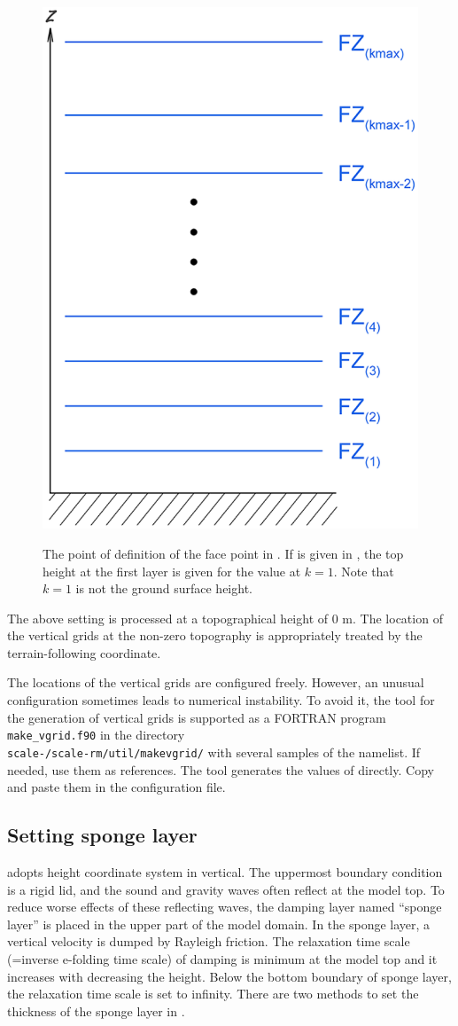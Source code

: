 \begin{figure}[tb]
\begin{center}
  \includegraphics[width=0.4\hsize]{./figure/verticalface.eps}\\
  \caption{The point of definition of the face point in \scalerm. If  is given in , the top height at the first layer is given for the value at $k=1$. Note that $k=1$ is not the ground surface height.}
  \label{fig:scale_grid}
\end{center}
\end{figure}

The above setting is processed at a topographical height of 0 m.
The location of the vertical grids at the non-zero topography is appropriately treated by the terrain-following coordinate.

The locations of the vertical grids are configured freely.
However, an unusual configuration sometimes leads to numerical instability. To avoid it, the tool for the generation of vertical grids is supported as a FORTRAN program \verb|make_vgrid.f90| in the directory\\ \texttt{scale-\version/scale-rm/util/makevgrid/} with several samples of the namelist. If needed, use them as references. The tool generates the values of  directly. Copy and paste them in the configuration file.

\subsection{Setting sponge layer} \label{subsec:raydamp}

\scalerm adopts height coordinate system in vertical. The uppermost boundary condition is a rigid lid, and the sound and gravity waves often reflect at the model top. To reduce worse effects of these reflecting waves, the damping layer named ``sponge layer'' is placed in the upper part of the model domain. In the sponge layer, a vertical velocity is dumped by Rayleigh friction. The relaxation time scale (=inverse e-folding time scale) of damping is minimum at the model top and it increases with decreasing the height. Below the bottom boundary of sponge layer, the relaxation time scale is set to infinity.
There are two methods to set the thickness of the sponge layer in .

